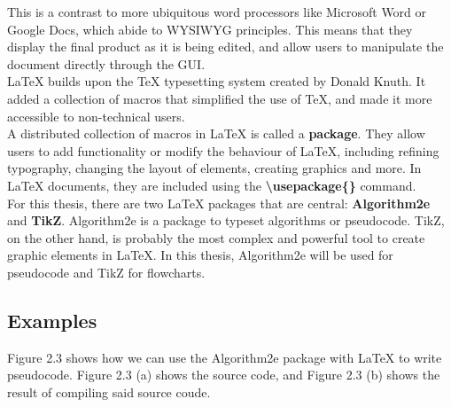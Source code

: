This is a contrast to more ubiquitous word processors like Microsoft Word or Google Docs, which abide to WYSIWYG principles. This means that they display the final product as it is being edited, and allow users to manipulate the document directly through the GUI. \hfill \\

LaTeX builds upon the TeX typesetting system created by Donald Knuth. It added a collection of macros that simplified the use of TeX, and made it more accessible to non-technical users. \hfill \\

A distributed collection of macros in LaTeX is called a \textbf{package}. They allow users to add functionality or modify the behaviour of LaTeX, including refining typography, changing the layout of elements, creating graphics and more. In LaTeX documents, they are included using the \textbf{\textbackslash usepackage\{\}} command. \hfill \\

For this thesis, there are two LaTeX packages that are central: \textbf{Algorithm2e} and \textbf{TikZ}. Algorithm2e is a package to typeset algorithms or pseudocode. TikZ, on the other hand, is probably the most complex and powerful tool to create graphic elements in LaTeX. In this thesis, Algorithm2e will be used for pseudocode and TikZ for flowcharts. \hfill \\


\subsection{Examples}

Figure 2.3 shows how we can use the Algorithm2e package with LaTeX to write pseudocode. Figure 2.3 (a) shows the source code, and Figure 2.3 (b) shows the result of compiling said source coude. \hfill \\

